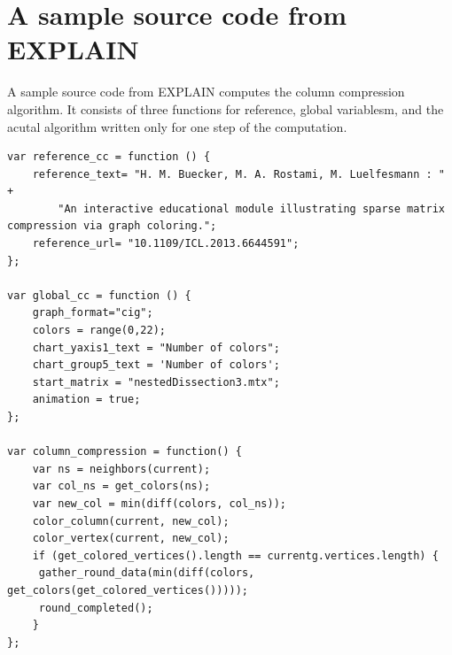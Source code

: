 \documentclass[11pt, twoside,a4paper]{book}
\begin{document}
\chapter{A sample source code from EXPLAIN}
\label{app.source}
A sample source code from EXPLAIN computes the column compression algorithm.
It consists of three functions for reference, global variablesm, and the acutal algorithm
written only for one step of the computation. 
\begin{lstlisting}
var reference_cc = function () {
    reference_text= "H. M. Buecker, M. A. Rostami, M. Luelfesmann : " +
        "An interactive educational module illustrating sparse matrix compression via graph coloring.";
    reference_url= "10.1109/ICL.2013.6644591";
};

var global_cc = function () {
    graph_format="cig";
    colors = range(0,22);
    chart_yaxis1_text = "Number of colors";
    chart_group5_text = 'Number of colors';
    start_matrix = "nestedDissection3.mtx";
    animation = true;
};

var column_compression = function() {
    var ns = neighbors(current);
    var col_ns = get_colors(ns);
    var new_col = min(diff(colors, col_ns));
    color_column(current, new_col);
    color_vertex(current, new_col);
    if (get_colored_vertices().length == currentg.vertices.length) {
     gather_round_data(min(diff(colors, get_colors(get_colored_vertices()))));
     round_completed();
    }
};
\end{lstlisting}
\end{document}
